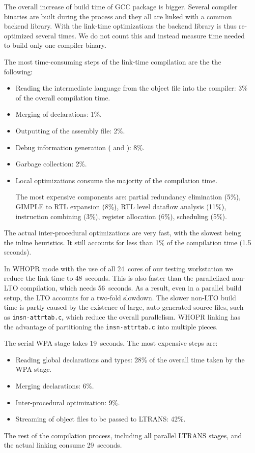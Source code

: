 \documentclass[final]{ols}
\begin{document}
The overall increase of build time of GCC package is bigger. Several compiler
binaries are built during the process and they all are linked with a common
backend library.  With the link-time optimizations the backend library is thus
re-optimized several times.  We do not count this and instead measure time
needed to build only one compiler binary.

The most time-consuming steps of the link-time compilation are the the following:
\begin{itemize}
\item Reading the intermediate language from the object file into the compiler: 3\% of the overall compilation time.
\item Merging of declarations: 1\%.
\item Outputting of the assembly file: 2\%.
\item Debug information generation ( and ): 8\%.
\item Garbage collection: 2\%.
\item Local optimizations consume the majority of the compilation time.

 The most expensive components are:
 partial redundancy elimination (5\%), GIMPLE to RTL expansion (8\%), RTL level dataflow analysis (11\%), instruction combining (3\%),
register allocation (6\%), scheduling (5\%).
\end{itemize}
The actual inter-procedural optimizations are very fast, with the slowest being the inline
heuristics. It still accounts for less than 1\% of the compilation time (1.5
seconds).

In WHOPR mode with the use of all 24~cores of our testing workstation
we reduce the link time to 48~seconds. This is also faster than the
parallelized non-LTO compilation, which needs 56~seconds.  As a result, even in
a parallel build setup, the LTO accounts for a two-fold slowdown.  The slower
non-LTO build time is partly caused by the existence of large, auto-generated
source files, such as {\tt insn-attrtab.c}, which reduce the overall parallelism.  WHOPR
linking has the advantage of partitioning the {\tt insn-attrtab.c} into multiple
pieces.

The serial WPA stage takes 19~seconds. The most expensive steps are:
\begin{itemize}
\item Reading global declarations and types: 28\% of the overall time taken by the WPA stage.
\item Merging declarations: 6\%.
\item Inter-procedural optimization: 9\%. 
\item Streaming of object files to be passed to LTRANS: 42\%.
\end{itemize}
The rest of the compilation process, including all parallel LTRANS stages, and the actual linking consume 
29~seconds.
\end{document}
